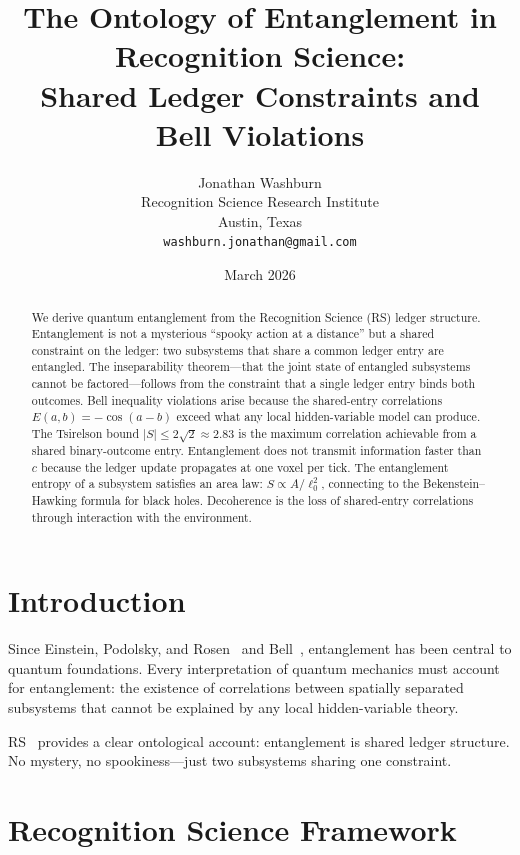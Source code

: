 \documentclass[12pt,a4paper]{article}
\title{The Ontology of Entanglement in Recognition Science:\\
Shared Ledger Constraints and Bell Violations}
\author{Jonathan Washburn\\
Recognition Science Research Institute\\
Austin, Texas\\
\texttt{washburn.jonathan@gmail.com}}
\date{March 2026}
\theoremstyle{definition}
\theoremstyle{remark}
\begin{document}
\maketitle

\begin{abstract}
We derive quantum entanglement from the Recognition Science (RS)
ledger structure.  Entanglement is not a mysterious ``spooky
action at a distance'' but a shared constraint on the ledger:
two subsystems that share a common ledger entry are entangled.
The inseparability theorem---that the joint state of entangled
subsystems cannot be factored---follows from the constraint that a
single ledger entry binds both outcomes.  Bell inequality violations
arise because the shared-entry correlations
$E(a, b) = -\cos(a - b)$ exceed what any local hidden-variable
model can produce.  The Tsirelson bound
$|S| \leq 2\sqrt{2} \approx 2.83$ is the maximum correlation
achievable from a shared binary-outcome entry.  Entanglement does
not transmit information faster than $c$ because the ledger
update propagates at one voxel per tick.  The entanglement entropy
of a subsystem satisfies an area law: $S \propto A/\ell_0^2$,
connecting to the Bekenstein--Hawking formula for black holes.
Decoherence is the loss of shared-entry correlations through
interaction with the environment.
\end{abstract}

\section{Introduction}
\label{sec:intro}

Since Einstein, Podolsky, and Rosen~\cite{EPR1935} and
Bell~\cite{Bell1964}, entanglement has been central to quantum
foundations.  Every interpretation of quantum
mechanics must account for entanglement: the existence of
correlations between spatially separated subsystems that cannot be
explained by any local hidden-variable theory.

RS~\cite{RS_Axioms} provides a clear ontological account: entanglement
is shared ledger structure.  No mystery, no spookiness---just two
subsystems sharing one constraint.

\section{Recognition Science Framework}
\label{sec:framework}
\end{document}
